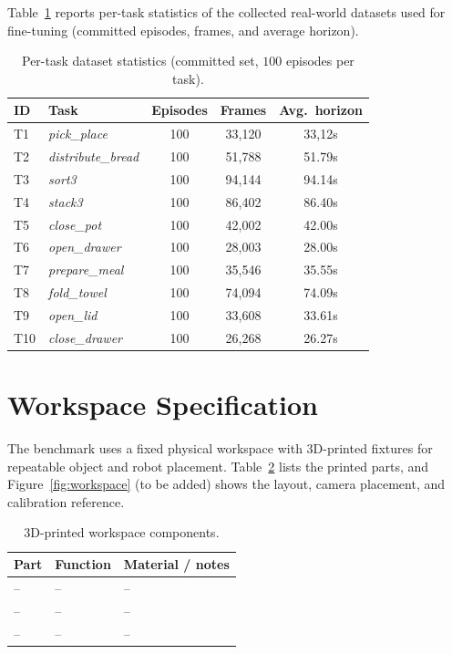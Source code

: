 \documentclass{article}
\begin{document}
Table~\ref{tab:datasets} reports per-task statistics of the collected real-world
datasets used for fine-tuning (committed episodes, frames, and average horizon).

\begin{table}[h]
\centering
\caption{Per-task dataset statistics (committed set, $100$ episodes per task).}
\label{tab:datasets}
\small
\setlength{\tabcolsep}{5pt}
\begin{tabular}{llccc}
\toprule
\textbf{ID} & \textbf{Task} & \textbf{Episodes} & \textbf{Frames} & \textbf{Avg.\ horizon} \\
\midrule
T1  & \textit{pick\_place}      & 100 & 33,120 & 33,12s \\
T2  & \textit{distribute\_bread}& 100 & 51,788 & 51.79s \\
T3  & \textit{sort3}            & 100 & 94,144 & 94.14s \\
T4  & \textit{stack3}           & 100 & 86,402 & 86.40s \\
T5  & \textit{close\_pot}       & 100 & 42,002 & 42.00s \\
T6  & \textit{open\_drawer}     & 100 & 28,003 & 28.00s \\
T7  & \textit{prepare\_meal}    & 100 & 35,546 & 35.55s \\
T8  & \textit{fold\_towel}      & 100 & 74,094 & 74.09s \\
T9  & \textit{open\_lid}        & 100 & 33,608 & 33.61s \\
T10 & \textit{close\_drawer}    & 100 & 26,268 & 26.27s \\
\bottomrule
\end{tabular}
\end{table}

\section{Workspace Specification}
\label{app:workspace}

The benchmark uses a fixed physical workspace with 3D-printed fixtures for
repeatable object and robot placement. Table~\ref{tab:workspace} lists the
printed parts, and Figure~\ref{fig:workspace} (to be added) shows the layout,
camera placement, and calibration reference.

\begin{table}[h]
\centering
\caption{3D-printed workspace components.}
\label{tab:workspace}
\small
\setlength{\tabcolsep}{6pt}
\begin{tabular}{lll}
\toprule
\textbf{Part} & \textbf{Function} & \textbf{Material / notes} \\
\midrule
-- & -- & -- \\
-- & -- & -- \\
-- & -- & -- \\
\bottomrule
\end{tabular}
\end{table}
\end{document}
